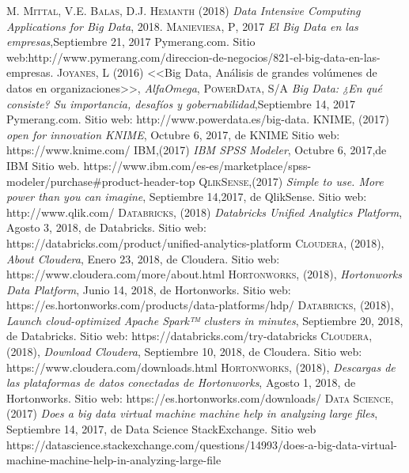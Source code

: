 \begin{thebibliography}{}
	 \textsc{M. Mittal, V.E. Balas, D.J. Hemanth} (2018) \textit{Data Intensive Computing Applications for Big Data}, 2018.
	 \textsc{Manieviesa, P}, 2017
	\textit{El Big Data en las empresas},Septiembre 21, 2017 Pymerang.com. Sitio web:http://www.pymerang.com/direccion-de-negocios/821-el-big-data-en-las-empresas.
	 \textsc{Joyanes, L} (2016)
	<<Big Data, Análisis de grandes volúmenes de datos en organizaciones>>,
	\textit{AlfaOmega},
	 \textsc{PowerData}, S/A
	\textit{Big Data: ¿En qué consiste? Su importancia, desafíos y gobernabilidad},Septiembre 14, 2017 Pymerang.com. Sitio web: http://www.powerdata.es/big-data.
	 \textsc{KNIME}, (2017)
	\textit{open for innovation KNIME}, Octubre 6, 2017, de KNIME Sitio web: https://www.knime.com/	
	 \textsc{IBM},(2017)
	\textit{IBM SPSS Modeler}, Octubre 6, 2017,de IBM Sitio web. 	
	https://www.ibm.com/es-es/marketplace/spss-modeler/purchase\#product-header-top
	 \textsc{QlikSense},(2017)
	\textit{ Simple to use. More power than you can imagine}, Septiembre 14,2017, de QlikSense. Sitio web: http://www.qlik.com/	
	 \textsc{Databricks}, (2018)
	\textit{Databricks Unified Analytics Platform}, Agosto 3, 2018, de Databricks. Sitio web: https://databricks.com/product/unified-analytics-platform
	 \textsc{Cloudera}, (2018), \textit{About Cloudera}, Enero 23, 2018, de Cloudera. Sitio web: https://www.cloudera.com/more/about.html
	 \textsc{Hortonworks}, (2018), \textit{Hortonworks Data Platform}, Junio 14, 2018, de Hortonworks. Sitio web: https://es.hortonworks.com/products/data-platforms/hdp/
	 \textsc{Databricks}, (2018), \textit{Launch cloud-optimized Apache Spark™ clusters in minutes}, Septiembre 20, 2018, de Databricks. Sitio web: https://databricks.com/try-databricks
	 \textsc{Cloudera}, (2018), \textit{Download Cloudera}, Septiembre 10, 2018, de Cloudera. Sitio web: https://www.cloudera.com/downloads.html
	 \textsc{Hortonworks}, (2018), \textit{Descargas de las plataformas de datos conectadas de Hortonworks}, Agosto 1, 2018, de Hortonworks. Sitio web: https://es.hortonworks.com/downloads/
	 \textsc{Data Science},(2017)
	\textit{Does a big data virtual machine machine help in analyzing large files}, Septiembre 14, 2017, de Data Science StackExchange. Sitio web https://datascience.stackexchange.com/questions/14993/does-a-big-data-virtual-machine-machine-help-in-analyzing-large-file	

\end{thebibliography}
